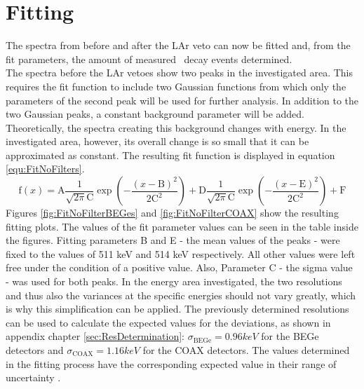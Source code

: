 \documentclass[encoding=utf8,british]{tumphthesis}
\begin{document}
\fi

\section{Fitting}
\label{sec:Fitting}

The spectra from before and after the LAr veto can now be fitted and, from the fit parameters, the amount of measured \Kr\ decay events determined.
\\

The spectra before the LAr vetoes show two peaks in the investigated area.
This requires the fit function to include two Gaussian functions from which only the parameters of the second peak will be used for further analysis.
In addition to the two Gaussian peaks, a constant background parameter will be added.
Theoretically, the  spectra creating this background changes with energy.
In the investigated area, however, its overall change is so small that it can be approximated as constant. 
The resulting fit function is displayed in equation \ref{equ:FitNoFilters}.
\begin{equation}
\mathrm{f}(x) = \mathrm{A}\frac{1}{\sqrt{2\pi}\mathrm{C}}\exp\left(-\frac{(x-\mathrm{B})^2}{2\mathrm{C}^2}\right) + \mathrm{D}\frac{1}{\sqrt{2\pi}\mathrm{C}}\exp\left(-\frac{(x-\mathrm{E})^2}{2\mathrm{C}^2}\right) + \mathrm{F}
\label{equ:FitNoFilters}
\end{equation}
Figures \ref{fig:FitNoFilterBEGes} and \ref{fig:FitNoFilterCOAX} show the resulting fitting plots.
The values of the fit parameter values can be seen in the table inside the figures.
Fitting parameters B and E - the mean values of the peaks - were fixed to the values of 511 keV and 514 keV respectively.
All other values were left free under the condition of a positive value.
Also, Parameter C - the sigma value - was used for both peaks.
In the energy area investigated, the two resolutions and thus also the variances at the specific energies should not vary greatly, which is why this simplification can be applied.
The previously determined resolutions can be used to calculate the expected values for the deviations, as shown in appendix chapter \ref{sec:ResDetermination}: $\sigma_{\mathrm{BEGe}} = 0.96 \unit{keV}$ for the BEGe detectors and $\sigma_{\mathrm{COAX}} = 1.16 \unit{keV}$ for the COAX detectors.
The values determined in the fitting process have the corresponding expected value in their range of uncertainty .
\\
\end{document}
